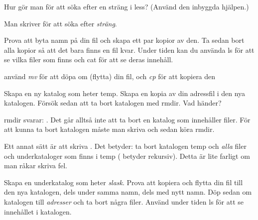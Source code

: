 \documentclass[a4paper,twocolumn]{book}
\begin{document}
\begin{exercise}
  Hur gör man för att söka efter en sträng i less? (Använd den inbyggda
  hjälpen.)
  \begin{answer}
    Man skriver  för att söka efter \emph{sträng}.
  \end{answer}
\end{exercise}

\begin{exercise}
  Prova att byta namn på din fil och skapa ett par kopior av den. Ta
  sedan bort alla kopior så att det bara finns en fil kvar. Under
  tiden kan du använda ls för att se vilka filer som finns och cat för
  att se deras innehåll.
  \begin{answer}
    använd \emph{mv} för att döpa om (flytta) din fil, och \emph{cp} för att kopiera den
  \end{answer}
\end{exercise}

\begin{exercise}
  Skapa en ny katalog som heter temp. Skapa en kopia av din adressfil
  i den nya katalogen. Försök sedan att ta bort katalogen med
  rmdir. Vad händer?
  \begin{answer}
    rmdir svarar: . Det går
    alltså inte att ta bort en katalog som innehåller filer. För att
    kunna ta bort katalogen måste man skriva  och
    sedan köra rmdir.

    Ett annat sätt är att skriva . Det betyder: ta
    bort katalogen temp och \emph{alla} filer och underkataloger som
    finns i temp ( betyder rekursiv). Detta är lite
    farligt om man råkar skriva fel.
  \end{answer}
\end{exercise}
\begin{exercise}
  Skapa en underkatalog som heter \emph{slask}. Prova att kopiera och
  flytta din fil till den nya katalogen, dels under samma namn, dels
  med nytt namn. Döp sedan om katalogen till \emph{adresser} och ta
  bort några filer.  Använd under tiden ls för att se innehållet i
  katalogen.
\end{exercise}
\end{document}
